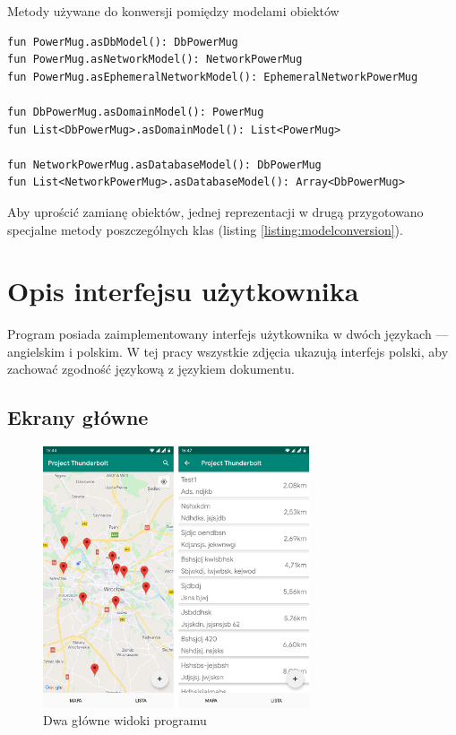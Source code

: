 \documentclass[polish,polish,a4paper,12pt]{article}
\let\sectioncmd\section
\renewcommand{\section}{\clearpage\sectioncmd}
\begin{document}
	\begin{listing}[H]
		\caption{Metody używane do konwersji pomiędzy modelami obiektów}
		\begin{verbatim}
fun PowerMug.asDbModel(): DbPowerMug
fun PowerMug.asNetworkModel(): NetworkPowerMug
fun PowerMug.asEphemeralNetworkModel(): EphemeralNetworkPowerMug

fun DbPowerMug.asDomainModel(): PowerMug
fun List<DbPowerMug>.asDomainModel(): List<PowerMug>

fun NetworkPowerMug.asDatabaseModel(): DbPowerMug
fun List<NetworkPowerMug>.asDatabaseModel(): Array<DbPowerMug>
		\end{verbatim}
		\label{listing:modelconversion}
	\end{listing}

	Aby uprościć zamianę obiektów, jednej reprezentacji w drugą przygotowano specjalne metody poszczególnych klas (listing \ref{listing:modelconversion}).

\section{Opis interfejsu użytkownika}\label{ui}

Program posiada zaimplementowany interfejs użytkownika w dwóch językach — angielskim i polskim. W tej pracy wszystkie zdjęcia ukazują interfejs polski, aby zachować zgodność językową z językiem dokumentu.

	\subsection{Ekrany główne}

	\begin{figure}[H]
		\centering
		\includegraphics[width = 0.7\textwidth]{screenshot-main}
		\caption{Dwa główne widoki programu}
		\label{fig:screenshotmain}
	\end{figure}
\end{document}
